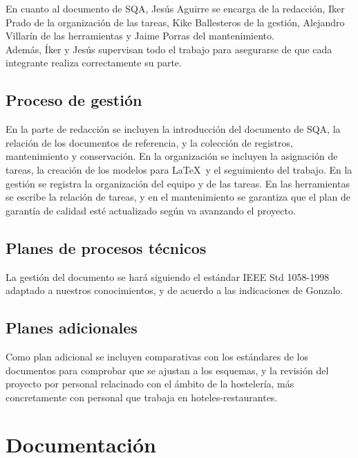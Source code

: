 \documentclass[spanish,a4paper,11pt, twoside]{report}	%
\begin{document}
	 En cuanto al documento de SQA, Jesús Aguirre se encarga de la redacción, Iker Prado de la organización de las tareas, Kike Ballesteros de la 
	gestión, Alejandro Villarín de las herramientas y Jaime Porras del mantenimiento.\\
	Además, Íker y Jesús supervisan todo el trabajo para asegurarse de que cada integrante realiza correctamente su parte.

	\section{ Proceso de gestión}
	
	En la parte de redacción se incluyen  la introducción del documento de SQA, la relación de los documentos de referencia, y la colección de registros, mantenimiento y conservación. En la organización se incluyen  la asignación de tareas, 
	la creación de los modelos para \LaTeX \ y el seguimiento del trabajo. En la gestión se registra la organización del equipo y de las tareas. En las herramientas se escribe la relación de tareas, y en el mantenimiento se garantiza
	que el plan de garantía de calidad esté actualizado según va avanzando el proyecto.\\

	\section{ Planes de procesos técnicos}
	
	La gestión del documento se hará siguiendo el estándar IEEE Std 1058-1998 adaptado a nuestros conocimientos, y de acuerdo a las indicaciones de Gonzalo.
	
	\section{ Planes adicionales}

	Como plan adicional  se incluyen comparativas con los estándares de los documentos para comprobar que se ajustan a los esquemas, y la revisión del proyecto por personal relacinado con el 
	ámbito de la hostelería, más concretamente con personal que trabaja en hoteles-restaurantes.

	


	

\newpage
\mbox{}
\thispagestyle{empty}						%
\newpage

\chapter{ Documentación}%
	
\end{document}
